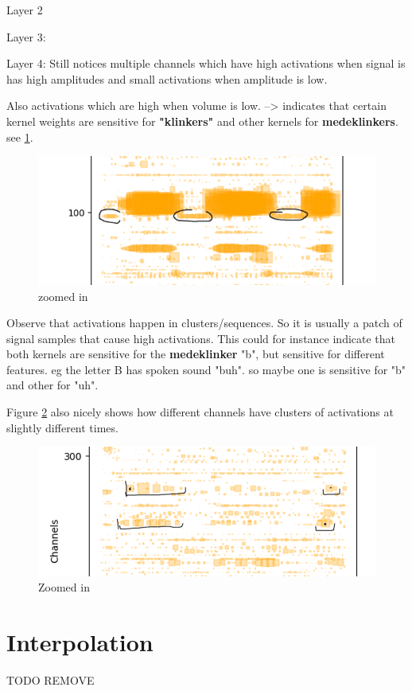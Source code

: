 \begin{appendices}
	Layer 2
	
	Layer 3:
	
	Layer 4:
	Still notices multiple channels which have high activations when signal is has high amplitudes and small activations when amplitude is low. 
	
	Also activations which are high when volume is low. --> indicates that certain kernel weights are sensitive for \textbf{"klinkers"} and other kernels for \textbf{medeklinkers}. see \ref{fig:screenshot008}.
	
	\begin{figure}[h]
		\centering
		\includegraphics[width=0.7\linewidth]{screenshot008}
		\caption{zoomed in}
		\label{fig:screenshot008}
	\end{figure}
	
	
	Observe that activations happen in clusters/sequences. So it is usually a patch of signal samples that cause high activations. This could for instance indicate that both kernels are sensitive for the \textbf{medeklinker} "b", but sensitive for different features. eg the letter B has spoken sound "buh". so maybe one is sensitive for "b" and other for "uh".
	
	Figure \ref{fig:layer4 zoomed in} also nicely shows how different channels have clusters of activations at slightly different times. 
	
	\begin{figure}[h]
		\centering
		\includegraphics[width=0.7\linewidth]{screenshot010}
		\caption{Zoomed in}
		\label{fig:layer4 zoomed in}
	\end{figure}
	
	
	\chapter{Interpolation} \label{cha:appendix_interpol}
	TODO REMOVE
	
		
	


\end{appendices}